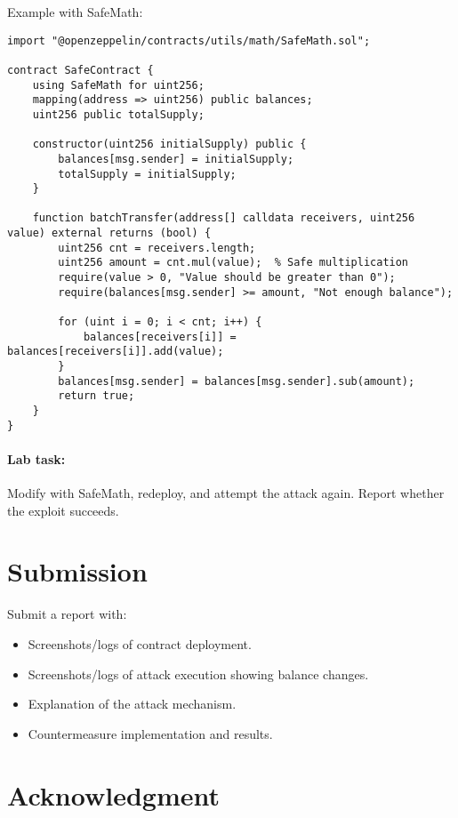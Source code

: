 Example with SafeMath:
\begin{lstlisting}[language=Solidity]
import "@openzeppelin/contracts/utils/math/SafeMath.sol";

contract SafeContract {
    using SafeMath for uint256;
    mapping(address => uint256) public balances;
    uint256 public totalSupply;

    constructor(uint256 initialSupply) public {
        balances[msg.sender] = initialSupply;
        totalSupply = initialSupply;
    }

    function batchTransfer(address[] calldata receivers, uint256 value) external returns (bool) {
        uint256 cnt = receivers.length;
        uint256 amount = cnt.mul(value);  % Safe multiplication
        require(value > 0, "Value should be greater than 0");
        require(balances[msg.sender] >= amount, "Not enough balance");

        for (uint i = 0; i < cnt; i++) {
            balances[receivers[i]] = balances[receivers[i]].add(value);
        }
        balances[msg.sender] = balances[msg.sender].sub(amount);
        return true;
    }
}
\end{lstlisting}

\paragraph{Lab task:} Modify  with SafeMath, redeploy, and attempt the attack again. Report whether the exploit succeeds.

\section{Submission}

Submit a report with:
\begin{itemize}
    \item Screenshots/logs of contract deployment.
    \item Screenshots/logs of attack execution showing balance changes.
    \item Explanation of the attack mechanism.
    \item Countermeasure implementation and results.
\end{itemize}

\section*{Acknowledgment}

